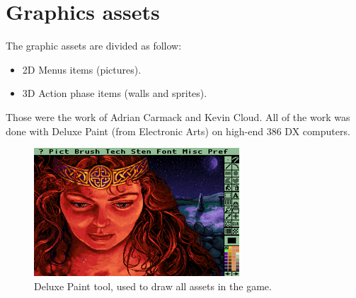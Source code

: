 \documentclass[book.tex]{subfiles}
\begin{document}
 
 
 




\section{Graphics assets}
The graphic assets are divided as follow:
\begin{itemize}
\item 2D Menus items (pictures).
\item 3D Action phase items (walls and sprites).
\end{itemize}
Those were the work of Adrian Carmack and Kevin Cloud. All of the work was done with Deluxe Paint (from Electronic Arts) on high-end 386 DX computers. 

\begin{figure}[H]
  \centering
 \includegraphics[width=\textwidth]{imgs/deluxe_paint.png}
 \caption{Deluxe Paint tool, used to draw all assets in the game.}
\end{figure}
\end{document}
